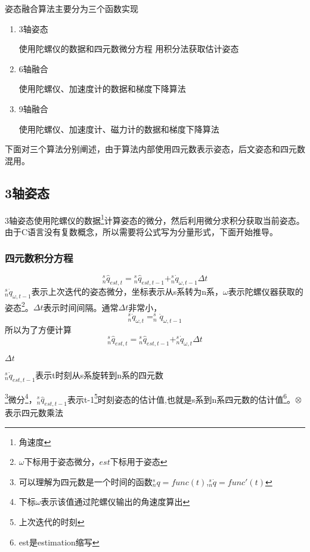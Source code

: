 \documentclass[12pt,a4paper]{article}
\begin{document}
姿态融合算法主要分为三个函数实现
\begin{enumerate}
    \item 3轴姿态

        使用陀螺仪的数据和四元数微分方程 用积分法获取估计姿态
    \item 6轴融合

        使用陀螺仪、加速度计的数据和梯度下降算法
    \item 9轴融合

        使用陀螺仪、加速度计、磁力计的数据和梯度下降算法
\end{enumerate}
下面对三个算法分别阐述，由于算法内部使用四元数表示姿态，后文姿态和四元数混用。

\subsection{3轴姿态}
3轴姿态使用陀螺仪的数据\footnote{角速度}计算姿态的微分，然后利用微分求积分获取当前姿态。由于C语言没有复数概念，所以需要将公式写为分量形式，下面开始推导。
\subsubsection{四元数积分方程}
\begin{equation}\label{四元数积分方程1}
    ^s_n\hat{q}_{est,t}={^s_n\hat{q}_{est,t-1}}+^s_n\dot{q}_{\omega,t-1}\Delta t
\end{equation} 
$^s_n\dot{q}_{\omega,t-1}$表示上次迭代的姿态微分，坐标表示从s系转为n系，$\omega$表示陀螺仪器获取的姿态\footnote{$\omega$下标用于姿态微分，$est$下标用于姿态}。$\Delta t$表示时间间隔。通常$\Delta t$非常小，
\begin{equation}\label{近似1}
^s_n\dot{q}_{\omega,t}=^s_n\dot{q}_{\omega,t-1}
\end{equation}
所以为了方便计算
\begin{equation}\label{四元数积分方程2}
    ^s_n\hat{q}_{est,t}={^s_n\hat{q}_{est,t-1}}+^s_n\dot{q}_{\omega,t}\Delta t
\end{equation}

$\Delta t$

$^s_n\dot{q}_{est,t-1}$表示t时刻从s系旋转到n系的四元数

\footnote{可以理解为四元数是一个时间的函数$^s_n{q}=func(t)$,$^s_n\dot{q}=func'(t)$}微分\footnote{下标$\omega$表示该值通过陀螺仪输出的角速度算出}，${^s_n\hat{q}_{est,t-1}}$表示t-1\footnote{上次迭代的时刻}时刻姿态的估计值,也就是s系到n系四元数的估计值\footnote{est是estimation缩写}。$\otimes$表示四元数乘法
\end{document}
